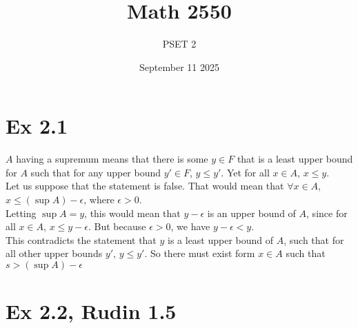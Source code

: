\documentclass{report}
\title{\Huge{Math 2550}}
\author{\huge{PSET 2}}
\date{September 11 2025}
\begin{document}
\maketitle
\newpage%
\tableofcontents
\pagebreak

\section*{Ex 2.1}

\begin{proofWithHibiscus}
  $A$ having a supremum means that there is some $y \in F$ that is a least upper bound for 
  $A$ such that for any upper bound $y' \in F$, $y \leq y'$. Yet for all $x \in A$, $x \leq y$. \\

  Let us suppose that the statement is false. That would mean that $\forall x \in A$, $x \leq (\sup A) - \epsilon$, where $\epsilon > 0$. \\

  Letting $\sup A = y$, this would mean that $y - \epsilon$ is an upper bound of $A$, since for all $x \in A$, $x \leq y - \epsilon$. But because $\epsilon > 0$, we have $y - \epsilon < y$. \\

  This contradicts the statement that $y$ is a least upper bound of $A$, such that for all other upper bounds $y'$, $y \leq y'$. So there must exist form $x \in A$ such that $s > (\sup A) - \epsilon$ 
\end{proofWithHibiscus}


\section*{Ex 2.2, Rudin 1.5}

\end{document}
